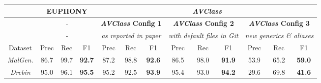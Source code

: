 \begin{tabular}{|c|ccc|ccc|ccc|ccc|}
    \hline
    & \multicolumn{3}{c|}{\textbf{EUPHONY}} & \multicolumn{9}{c|}{{\em \textbf{AVClass}}} \\
    \hline
    & \multicolumn{3}{c|}{-} & \multicolumn{3}{c|}{\textbf{{\em AVClass} Config 1}} & \multicolumn{3}{c|}{\textbf{{\em AVClass} Config 2}} & \multicolumn{3}{c|}{\textbf{{\em AVClass} Config 3}} \\
    & \multicolumn{3}{c|}{- } & \multicolumn{3}{c|}{\em as reported in paper} & \multicolumn{3}{c|}{\em with default files in Git} & \multicolumn{3}{c|}{\em new generics \& aliases} \\
    \hline
    Dataset & Prec & Rec & F1 & Prec & Rec & F1 & Prec & Rec & F1 & Prec & Rec & F1 \\
    \hline
    {\em MalGen.} & 86.7 & 99.7 & \textbf{92.7} & 87.2 & 98.8 & \textbf{92.6} & 86.5 & 98.0 & \textbf{91.9} & 53.9 & 65.2 & \textbf{59.0} \\
    {\em Drebin} & 95.0 & 96.1 & \textbf{95.5} & 95.2 & 92.5 & \textbf{93.9} & 95.4 & 93.0 & \textbf{94.2} & 29.6 & 69.8 & \textbf{41.6} \\
    \hline
\end{tabular}
